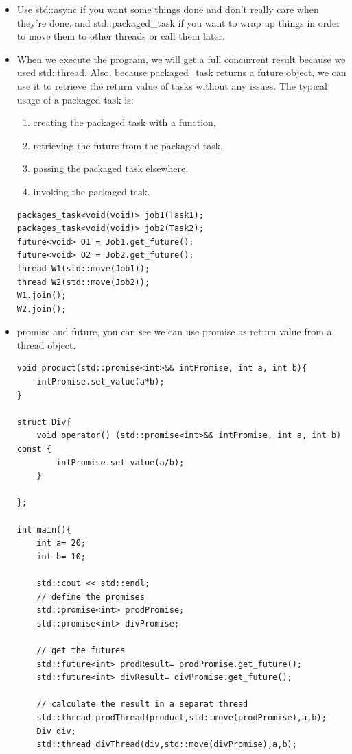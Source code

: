 \documentclass[a4paper,11pt,twoside]{book}
\begin{document}
\begin{itemize}
\item Use std::async if you want some things done and don't really care when they're done, and std::packaged\_task if you want to wrap up things in order to move them to other threads or call them later.

\item When we execute the program, we will get a full concurrent result because we used std::thread. Also, because packaged\_task returns a future object, we can use it to retrieve the return value of tasks without any issues. The typical usage of a packaged task is:

\begin{enumerate}
	\item creating the packaged task with a function,
	\item retrieving the future from the packaged task,
	\item passing the packaged task elsewhere,
	\item invoking the packaged task.
\end{enumerate}
\begin{lstlisting}[numbers=none]
packages_task<void(void)> job1(Task1);	
packages_task<void(void)> job2(Task2);	
future<void> O1 = Job1.get_future();
future<void> O2 = Job2.get_future();
thread W1(std::move(Job1));
thread W2(std::move(Job2));
W1.join();
W2.join();
\end{lstlisting}


\item promise and future, you can see we can use promise as return value from a thread object.
\begin{lstlisting}[numbers=none]
void product(std::promise<int>&& intPromise, int a, int b){
	intPromise.set_value(a*b);
}

struct Div{	
	void operator() (std::promise<int>&& intPromise, int a, int b) const {
		intPromise.set_value(a/b);
	}
	
};

int main(){	
	int a= 20;
	int b= 10;
	
	std::cout << std::endl;
	// define the promises
	std::promise<int> prodPromise;
	std::promise<int> divPromise;
	
	// get the futures
	std::future<int> prodResult= prodPromise.get_future();
	std::future<int> divResult= divPromise.get_future();
	
	// calculate the result in a separat thread
	std::thread prodThread(product,std::move(prodPromise),a,b);
	Div div;
	std::thread divThread(div,std::move(divPromise),a,b);
	

\end{lstlisting}
\end{itemize}
\end{document}
